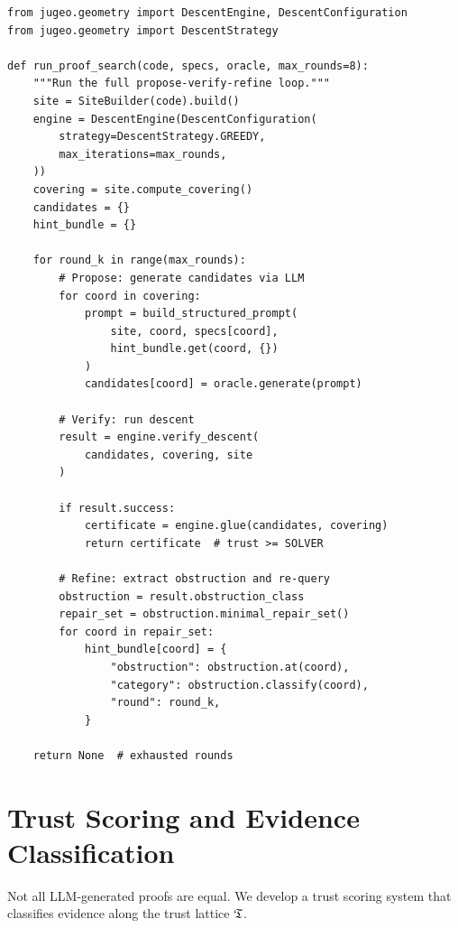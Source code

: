 \documentclass[11pt]{article}
\begin{document}
\begin{lstlisting}[style=jugeo-python,caption={Obstruction-guided refinement in the descent loop.}]
from jugeo.geometry import DescentEngine, DescentConfiguration
from jugeo.geometry import DescentStrategy

def run_proof_search(code, specs, oracle, max_rounds=8):
    """Run the full propose-verify-refine loop."""
    site = SiteBuilder(code).build()
    engine = DescentEngine(DescentConfiguration(
        strategy=DescentStrategy.GREEDY,
        max_iterations=max_rounds,
    ))
    covering = site.compute_covering()
    candidates = {}
    hint_bundle = {}

    for round_k in range(max_rounds):
        # Propose: generate candidates via LLM
        for coord in covering:
            prompt = build_structured_prompt(
                site, coord, specs[coord],
                hint_bundle.get(coord, {})
            )
            candidates[coord] = oracle.generate(prompt)

        # Verify: run descent
        result = engine.verify_descent(
            candidates, covering, site
        )

        if result.success:
            certificate = engine.glue(candidates, covering)
            return certificate  # trust >= SOLVER

        # Refine: extract obstruction and re-query
        obstruction = result.obstruction_class
        repair_set = obstruction.minimal_repair_set()
        for coord in repair_set:
            hint_bundle[coord] = {
                "obstruction": obstruction.at(coord),
                "category": obstruction.classify(coord),
                "round": round_k,
            }

    return None  # exhausted rounds
\end{lstlisting}


\section{Trust Scoring and Evidence Classification}\label{sec:trust-scoring}

Not all LLM-generated proofs are equal.  We develop a trust scoring
system that classifies evidence along the trust lattice $\mathfrak{T}$.

\end{document}
